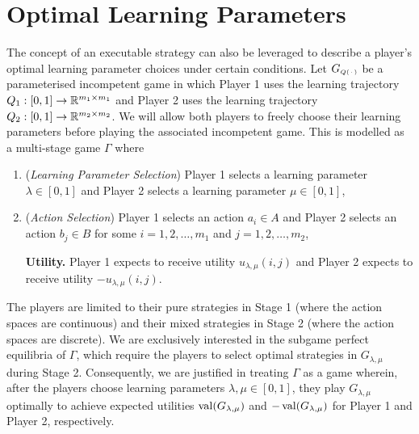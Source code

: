 \section{Optimal Learning Parameters}  \label{sec:optimal-learning-parameters}
    The concept of an executable strategy can also be leveraged to describe a player's optimal learning parameter choices under certain conditions.
    Let $G_\ms{Q(\funcdot)}$ be a parameterised incompetent game in which Player 1 uses the learning trajectory $Q_1 : [0, 1] \to \mathbb{R}^{m_1 \times m_1}$ and Player 2 uses the learning trajectory $Q_2 : [0, 1] \to \mathbb{R}^{m_2 \times m_2}$.
    We will allow both players to freely choose their learning parameters before playing the associated incompetent game.
    This is modelled as a multi-stage game $\Gamma$ where
    \begin{enumerate}[
        leftmargin=*,
        align=left,
        label=\textbf{Stage \arabic*.}
    ]
        \item (\textit{Learning Parameter Selection})
            Player 1 selects a learning parameter $\lambda \in [0, 1]$ and Player 2 selects a learning parameter $\mu \in [0, 1]$,

        \item (\textit{Action Selection})
            Player 1 selects an action $a_i \in A$ and Player 2 selects an action $b_j \in B$ for some $i = 1, 2, \ldots, m_1$ and $j = 1, 2, \ldots, m_2$,
        
        \item[\textbf{Utility.}]
            Player 1 expects to receive utility $u_{\lambda, \mu}(i, j)$ and Player 2 expects to receive utility $-u_{\lambda, \mu}(i, j)$.
    \end{enumerate}
    The players are limited to their pure strategies in Stage 1 (where the action spaces are continuous) and their mixed strategies in Stage 2 (where the action spaces are discrete).
    We are exclusively interested in the subgame perfect equilibria of $\Gamma$, which require the players to select optimal strategies in $G_{\lambda, \mu}$ during Stage 2.
    Consequently, we are justified in treating $\Gamma$ as a game wherein, after the players choose learning parameters $\lambda, \mu \in [0, 1]$, they play $G_{\lambda, \mu}$ optimally to achieve expected utilities $\operatorname{val}(G_{\lambda, \mu})$ and $-\operatorname{val}(G_{\lambda, \mu})$ for Player 1 and Player 2, respectively.

